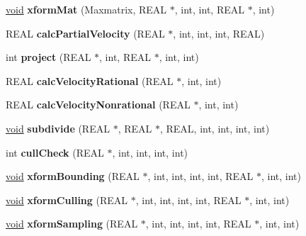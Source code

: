 \begin{DoxyCompactItemize}
\item 
\mbox{\label{class_mapdesc_abe2174cb11b6483e2797716ae3feb5f0}} 
\hyperlink{interfacevoid}{void} {\bfseries xform\+Mat} (Maxmatrix, R\+E\+AL $\ast$, int, int, R\+E\+AL $\ast$, int)
\item 
\mbox{\label{class_mapdesc_a03953fd0248f6200529af64433ba6203}} 
R\+E\+AL {\bfseries calc\+Partial\+Velocity} (R\+E\+AL $\ast$, int, int, int, R\+E\+AL)
\item 
\mbox{\label{class_mapdesc_ad2d33818000779d5425feeb59224ba4d}} 
int {\bfseries project} (R\+E\+AL $\ast$, int, R\+E\+AL $\ast$, int, int)
\item 
\mbox{\label{class_mapdesc_aef81d82d6401577c5819a00a67d8dc8e}} 
R\+E\+AL {\bfseries calc\+Velocity\+Rational} (R\+E\+AL $\ast$, int, int)
\item 
\mbox{\label{class_mapdesc_ac3b41990177417bc37188f32e7ae40d7}} 
R\+E\+AL {\bfseries calc\+Velocity\+Nonrational} (R\+E\+AL $\ast$, int, int)
\item 
\mbox{\label{class_mapdesc_ae68c7d18bbdddc202018d3101f55d87b}} 
\hyperlink{interfacevoid}{void} {\bfseries subdivide} (R\+E\+AL $\ast$, R\+E\+AL $\ast$, R\+E\+AL, int, int, int, int)
\item 
\mbox{\label{class_mapdesc_a5e0dd5d1b0e5ef621537bf815c834bab}} 
int {\bfseries cull\+Check} (R\+E\+AL $\ast$, int, int, int, int)
\item 
\mbox{\label{class_mapdesc_a2c9343dbdcdfa9a5f76b9d9d9e4d5add}} 
\hyperlink{interfacevoid}{void} {\bfseries xform\+Bounding} (R\+E\+AL $\ast$, int, int, int, int, R\+E\+AL $\ast$, int, int)
\item 
\mbox{\label{class_mapdesc_aa3fd61b6191ed79507c21b97c6fb20d0}} 
\hyperlink{interfacevoid}{void} {\bfseries xform\+Culling} (R\+E\+AL $\ast$, int, int, int, int, R\+E\+AL $\ast$, int, int)
\item 
\mbox{\label{class_mapdesc_a548262fc648a02c71d216afe7e88d177}} 
\hyperlink{interfacevoid}{void} {\bfseries xform\+Sampling} (R\+E\+AL $\ast$, int, int, int, int, R\+E\+AL $\ast$, int, int)

\end{DoxyCompactItemize}
